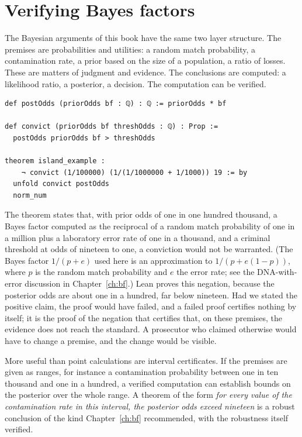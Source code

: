 \section{Verifying Bayes factors}

The Bayesian arguments of this book have the same two layer structure. The premises are probabilities and utilities: a random match probability, a contamination rate, a prior based on the size of a population, a ratio of losses. These are matters of judgment and evidence. The conclusions are computed: a likelihood ratio, a posterior, a decision. The computation can be verified.

\begin{lstlisting}[language=Lean, caption={Odds form of Bayes and a decision certificate.}]
def postOdds (priorOdds bf : ℚ) : ℚ := priorOdds * bf

def convict (priorOdds bf threshOdds : ℚ) : Prop :=
  postOdds priorOdds bf > threshOdds

theorem island_example :
    ¬ convict (1/100000) (1/(1/1000000 + 1/1000)) 19 := by
  unfold convict postOdds
  norm_num
\end{lstlisting}

The theorem states that, with prior odds of one in one hundred thousand, a Bayes factor computed as the reciprocal of a random match probability of one in a million plus a laboratory error rate of one in a thousand, and a criminal threshold at odds of nineteen to one, a conviction would not be warranted. (The Bayes factor $1/(p+e)$ used here is an approximation to $1/(p+e(1-p))$, where $p$ is the random match probability and $e$ the error rate; see the DNA-with-error discussion in Chapter~\ref{ch:bf}.) Lean proves this negation, because the posterior odds are about one in a hundred, far below nineteen. Had we stated the positive claim, the proof would have failed, and a failed proof certifies nothing by itself; it is the proof of the negation that certifies that, on these premises, the evidence does not reach the standard. A prosecutor who claimed otherwise would have to change a premise, and the change would be visible.

More useful than point calculations are interval certificates. If the premises are given as ranges, for instance a contamination probability between one in ten thousand and one in a hundred, a verified computation can establish bounds on the posterior over the whole range. A theorem of the form \emph{for every value of the contamination rate in this interval, the posterior odds exceed nineteen} is a robust conclusion of the kind Chapter~\ref{ch:bf} recommended, with the robustness itself verified.


